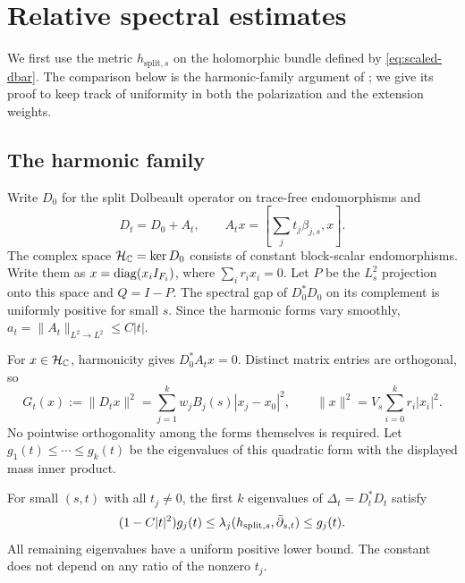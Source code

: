 \section{Relative spectral estimates}
\label{sec:spectrum}

We first use the metric $h_{\mathrm{split},s}$ on the holomorphic bundle
defined by \eqref{eq:scaled-dbar}. The comparison below is the
harmonic-family argument of \cite{Flow}; we give its proof to keep
track of uniformity in both the polarization and the extension weights.

\subsection{The harmonic family}
Write $D_0$ for the split Dolbeault operator on trace-free endomorphisms
and
\[
 D_t=D_0+A_t,\qquad A_tx=\left[\sum_jt_j\beta_{j,s},x\right].
\]
The complex space $\mathcal H_\mathbb C=\ker D_0$ consists of constant
block-scalar endomorphisms. Write them as
$x=\operatorname{diag}(x_iI_{F_i})$, where $\sum_ir_ix_i=0$.
Let $P$ be the $L^2_s$ projection onto this space and $Q=I-P$.
The spectral gap of $D_0^*D_0$ on its complement is uniformly
positive for small $s$. Since the harmonic forms vary smoothly,
$a_t=\|A_t\|_{L^2\to L^2}\le C|t|$.

For $x\in\mathcal H_\mathbb C$, harmonicity gives $D_0^*A_tx=0$. Distinct
matrix entries are orthogonal, so
\begin{equation}\label{eq:harmonic-graph}
 G_t(x):=\|D_tx\|^2
   =\sum_{j=1}^kw_jB_j(s)|x_j-x_0|^2,\qquad
 \|x\|^2=V_s\sum_{i=0}^kr_i|x_i|^2.
\end{equation}
No pointwise orthogonality among the forms themselves is required.
Let $g_1(t)\le\cdots\le g_k(t)$ be the eigenvalues of this
quadratic form with the displayed mass inner product.

\begin{lemma}\label{lem:relative-schur}
For small $(s,t)$ with all $t_j\ne0$, the first $k$ eigenvalues
of $\Delta_t=D_t^*D_t$ satisfy
\begin{equation}\label{eq:relative-schur}
 (1-C|t|^2)g_j(t)\le\lambda_j(h_{\mathrm{split},s},\bar\partial_{s,t})\le g_j(t).
\end{equation}
All remaining eigenvalues have a uniform positive lower bound.
The constant does not depend on any ratio of the nonzero $t_j$.
\end{lemma}

